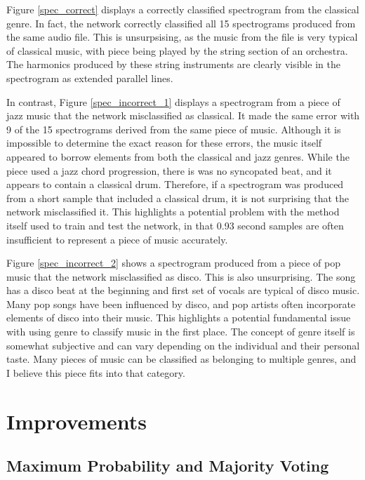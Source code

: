 \documentclass[conference]{IEEEtran}
\begin{document}
Figure \ref{spec_correct} displays a correctly classified spectrogram from the classical genre.
In fact, the network correctly classified all 15 spectrograms produced from the same audio file.
This is unsurpsising, as the music from the file is very typical of classical music, with piece being played by the string section of an orchestra.
The harmonics produced by these string instruments are clearly visible in the spectrogram as extended parallel lines.

In contrast, Figure \ref{spec_incorrect_1} displays a spectrogram from a piece of jazz music that the network misclassified as classical.
It made the same error with 9 of the 15 spectrograms derived from the same piece of music.
Although it is impossible to determine the exact reason for these errors, the music itself appeared to borrow elements from both the classical and jazz genres.
While the piece used a jazz chord progression, there is was no syncopated beat, and it appears to contain a classical drum.
Therefore, if a spectrogram was produced from a short sample that included a classical drum, it is not surprising that the network misclassified it.
This highlights a potential problem with the method itself used to train and test the network, in that 0.93 second samples are often insufficient to represent a piece of music accurately.

Figure \ref{spec_incorrect_2} shows a spectrogram produced from a piece of pop music that the network misclassified as disco.
This is also unsurprising.
The song has a disco beat at the beginning and first set of vocals are typical of disco music.
Many pop songs have been influenced by disco, and pop artists often incorporate elements of disco into their music.
This highlights a potential fundamental issue with using genre to classify music in the first place.
The concept of genre itself is somewhat subjective and can vary depending on the individual and their personal taste.
Many pieces of music can be classified as belonging to multiple genres, and I believe this piece fits into that category.

\section{Improvements}

\subsection{Maximum Probability and Majority Voting}
\end{document}
